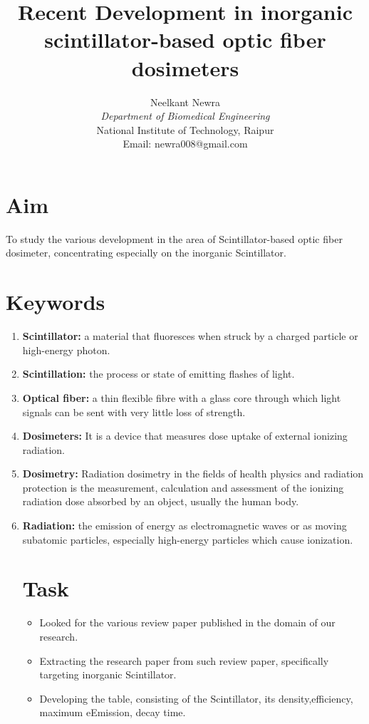 \documentclass{article}
\title{\textbf{Recent Development in inorganic scintillator-based optic fiber dosimeters}}
\author{Neelkant Newra \\ \textit{Department of Biomedical Engineering} \\ National Institute of Technology, Raipur \\ Email: newra008@gmail.com}
\begin{document}
\maketitle

\section*{Aim}
To study the various development in the area of Scintillator-based optic fiber dosimeter, concentrating especially on the inorganic Scintillator. 
\section*{Keywords}

\begin{enumerate}
    \item \textbf{Scintillator:}  a material that fluoresces when struck by a charged particle or high-energy photon.  
    \item \textbf{Scintillation:}  the process or state of emitting flashes of light.
     \item \textbf{Optical fiber:}  a thin flexible fibre with a glass core through which light signals can be sent with very little loss of strength.
     \item \textbf{Dosimeters:}  It is a device that measures dose uptake of external ionizing radiation.
     \item \textbf{Dosimetry:}  Radiation dosimetry in the fields of health physics and radiation protection is the measurement, calculation and assessment of the ionizing radiation dose absorbed by an object, usually the human body.
     \item \textbf{Radiation:}  the emission of energy as electromagnetic waves or as moving subatomic particles, especially high-energy particles which cause ionization.
     
\section*{Task}

\begin{itemize}
    \item Looked for the various review paper published in the domain of our research. 
    \item Extracting the research paper from such review paper, specifically targeting inorganic Scintillator. 
    \item Developing the table, consisting of the Scintillator, its density,efficiency, maximum eEmission, decay time. 
\end{itemize} 
     
    
\end{enumerate}
\end{document}
